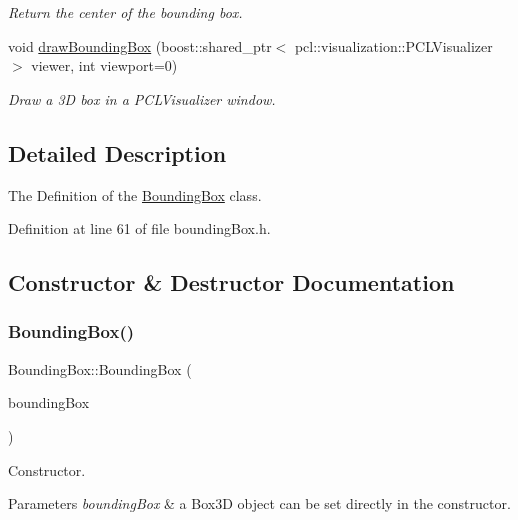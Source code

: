 \begin{DoxyCompactItemize}
\begin{DoxyCompactList}\small\item\em Return the center of the bounding box. \end{DoxyCompactList}\item 
void \hyperlink{classiCub_1_1data3D_1_1BoundingBox_a45bbf770b8c816f6c7d47ba747beaaaf}{draw\+Bounding\+Box} (boost\+::shared\+\_\+ptr$<$ pcl\+::visualization\+::\+P\+C\+L\+Visualizer $>$ viewer, int viewport=0)
\begin{DoxyCompactList}\small\item\em Draw a 3D box in a P\+C\+L\+Visualizer window. \end{DoxyCompactList}\end{DoxyCompactItemize}


\subsection{Detailed Description}
The Definition of the \hyperlink{classiCub_1_1data3D_1_1BoundingBox}{Bounding\+Box} class. 

Definition at line 61 of file bounding\+Box.\+h.



\subsection{Constructor \& Destructor Documentation}
\label{classiCub_1_1data3D_1_1BoundingBox_a5c2f97ac3178b7b04610428d4cf14a3d} 
\subsubsection{\texorpdfstring{Bounding\+Box()}{BoundingBox()}}
{\footnotesize\ttfamily Bounding\+Box\+::\+Bounding\+Box (\begin{DoxyParamCaption}\item[{const i\+Cub\+::data3\+D\+::\+Box3D \&}]{bounding\+Box }\end{DoxyParamCaption})}



Constructor. 


\begin{DoxyParams}{Parameters}
{\em bounding\+Box} & a Box3D object can be set directly in the constructor. \\
\hline
\end{DoxyParams}


